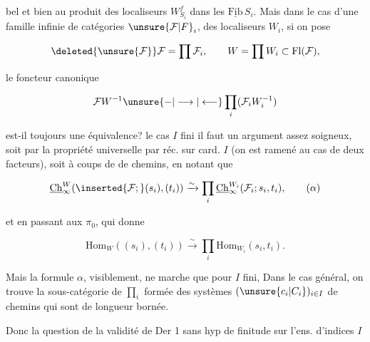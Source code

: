 
bel et bien au produit des localiseurs $W^f_{S_i}$ dans les $\underline{\mathrm{Fib}}\,S_i$. Mais dans le cas d'une famille  infinie de catégories $\unsure{\mathcal F|F}_i$,  des localiseurs $W_i$, si on pose

\[
\deleted{\unsure{\mathcal F}}\mathcal F=\prod\mathcal F_i,\qquad W=\prod W_i\subset\mathrm{Fl}(\mathcal F),
\]

le foncteur canonique

\[
\mathcal F W^{-1}\unsure{\mathord{-}|\longrightarrow|\longleftarrow}\prod_i(\mathcal F_i W_i^{-1})
\]

est-il toujours une équivalence?  le cas $I$ fini il faut  un argument assez soigneux, soit par la propriété universelle par réc. sur card. $I$ (on est ramené au cas de deux facteurs), soit à coups de   de chemins, en notant que

\[
\underline{\mathrm{Ch}}^{W}_{\infty}(\inserted{\mathcal F;}(s_i),(t_i))
 \xrightarrow{\sim}\prod_i\underline{\mathrm{Ch}}^{W_i}_{\infty}(\mathcal F_i;s_i,t_i),
\tag*{($\alpha$)}
\]

et en passant aux $\pi_0$, qui donne

\[
\mathrm{Hom}_W((s_i),(t_i))\xrightarrow{\sim}\prod_i\mathrm{Hom}_{W_i}(s_i,t_i).
\]

Mais la formule $\alpha$, visiblement, ne marche que pour $I$ fini, Dans le cas général, on trouve la sous-catégorie  de $\prod_i$ formée des systèmes $(\unsure{c_i|C_i})_{i\in I}$ de chemins qui sont de longueur bornée.

Donc la question de la validité de Der 1 sans hyp de finitude sur l'ens. d'indices $I$
